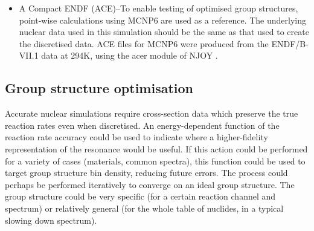 \begin{itemize}
FISPACT can take an arbitrary particle spectrum as input. For the simulations described below two broad cases were used: 

\begin{enumerate}
  \item Realistic spectra, sampled from a stochastic radiation transport code (MCNP6). These were sampled in the relevant group structure and allow comparison between group-wise and point-wise calculations. 
  \item `Parametric spectra' where a flux for each group structure bin was calculated from a relationship of the sort: $\log_{10}\phi(E) = m\log_{10}(E) + c$, a linear relationship in log-log space. If $c = 0$, this is simply $\phi(E) = E^{m}$. By varying $m$, the gradient of the slowing-down region can be modified and greater weight given to cross-sections (and resonances) within the low or high energy regions. This $m$ parameter is an input to the optimisation process outlined below, in section~\ref{subsec:opt}.
\end{enumerate}

\item A Compact ENDF (ACE)--To enable testing of optimised group structures, point-wise calculations using MCNP6 are used as a reference. The underlying nuclear data used in this simulation should be the same as that used to create the discretised data. ACE files for MCNP6 were produced from the ENDF/B-VII.1 data at 294K, using the acer module of NJOY \cite{MacFarlane2016}.
\end{itemize}

\subsection{Group structure optimisation}
\label{subsec:opt}
Accurate nuclear simulations require cross-section data which preserve the true reaction rates even when discretised. An energy-dependent function of the reaction rate accuracy could be used to indicate where a higher-fidelity representation of the resonance would be useful. If this action could be performed for a variety of cases (materials, common spectra), this function could be used to target group structure bin density, reducing future errors. The process could perhaps be performed iteratively to converge on an ideal group structure. The group structure could be very specific (for a certain reaction channel and spectrum) or relatively general (for the whole table of nuclides, in a typical slowing down spectrum).

